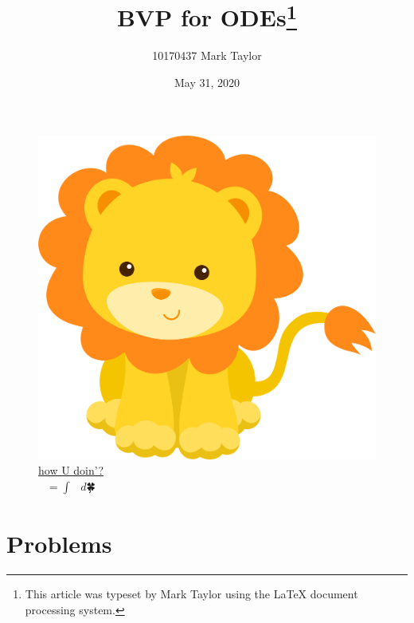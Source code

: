 \documentclass[a4paper,english]{article}
\begin{document}
	\thispagestyle{empty}
	\begin{figure}
		\centering
		\includegraphics[width=0.81\paperwidth]{img/lion.png}
		\caption*{\href{https://github.com/How-u-doing}{how U doin'?}
			\\ $🐳^{🐳^{🐳}} = ∫_{🎃}^{🎅} 🐑 \ d🍀$ }
		\label{cover:lion}
	\end{figure}
	\pagecolor{pink}
	\afterpage{\nopagecolor}
	\clearpage
	\newpage
	
	\title{BVP for ODEs\thanks{This article was typeset by Mark Taylor using 
	the \protect\LaTeX{}
			document processing system. }}
	
	\author{10170437 Mark Taylor}
	
	\date{May 31, 2020}
	
	\maketitle
	
	\hypertarget{Contents}{}  %
	\tableofcontents
	
	\section{Problems}
	
\end{document}
